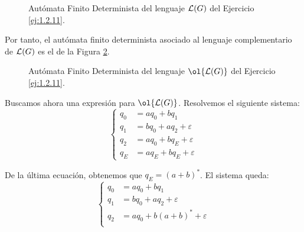 \begin{ejercicio}
\begin{figure}
\begin{tikzpicture}
        \end{tikzpicture}
        \caption{Autómata Finito Determinista del lenguaje $\cc{L}(G)$ del Ejercicio \ref{ej:1.2.11}.}
        \label{fig:ej:1.2.11_L_exp}
    \end{figure}

    Por tanto, el autómata finito determinista asociado al lenguaje complementario de $\cc{L}(G)$ es el de la Figura \ref{fig:ej:1.2.11_L_comp}.
    \begin{figure}
        \centering
        \caption{Autómata Finito Determinista del lenguaje $\ol{\cc{L}(G)}$ del Ejercicio \ref{ej:1.2.11}.}
        \label{fig:ej:1.2.11_L_comp}
    \end{figure}

    Buscamos ahora una expresión para $\ol{\cc{L}(G)}$. Resolvemos el siguiente sistema:
    \begin{equation*}
        \begin{cases}
            q_0 &= aq_0 + bq_1\\
            q_1 &= bq_0 + aq_2 + \varepsilon\\
            q_2 &= aq_0 + bq_E + \varepsilon\\
            q_E &= aq_E + bq_E + \varepsilon
        \end{cases}
    \end{equation*}

    De la última ecuación, obtenemos que $q_E = (a+b)^*$. El sistema queda:
    \begin{equation*}
        \begin{cases}
            q_0 &= aq_0 + bq_1\\
            q_1 &= bq_0 + aq_2 + \varepsilon\\
            q_2 &= aq_0 + b(a+b)^* + \varepsilon\\
        \end{cases}
    \end{equation*}


\end{ejercicio}
